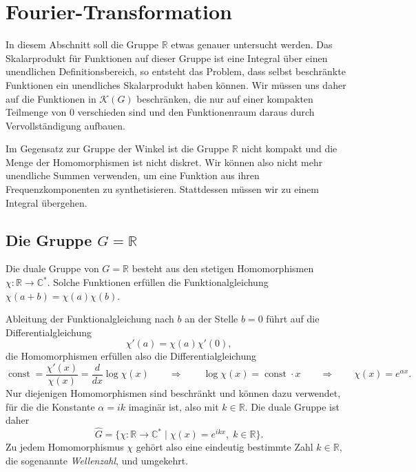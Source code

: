 %
%
%
\section{Fourier-Transformation
\label{buch:gruppen:section:fourier}}
In diesem Abschnitt soll die Gruppe $\mathbb{R}$ etwas genauer untersucht
werden.
Das Skalarprodukt für Funktionen auf dieser Gruppe ist eine Integral über
einen unendlichen Definitionsbereich, so entsteht das Problem, dass
selbst beschränkte Funktionen ein unendliches Skalarprodukt haben können.
Wir müssen uns daher auf die Funktionen in $\mathscr{K}(G)$ beschränken,
die nur auf einer kompakten Teilmenge von $0$ verschieden sind und den
Funktionenraum daraus durch Vervollständigung aufbauen.

Im Gegensatz zur Gruppe der Winkel ist die Gruppe $\mathbb{R}$ nicht kompakt
und die Menge der Homomorphismen ist nicht diskret.
Wir können also nicht mehr unendliche Summen verwenden, um eine Funktion
aus ihren Frequenzkomponenten zu synthetisieren.
Stattdessen müssen wir zu einem Integral übergehen.

%
%
\subsection{Die Gruppe $G=\mathbb{R}$
\label{buch:gruppen:fourier:subsection:gruppeR}}
Die duale Gruppe von $G=\mathbb{R}$ besteht aus den stetigen Homomorphismen
$\chi:\mathbb{R}\to\mathbb{C}^*$.
Solche Funktionen erfüllen die Funktionalgleichung $\chi(a+b)=\chi(a)\chi(b)$.

Ableitung der Funktionalgleichung nach $b$ an der Stelle $b=0$ führt auf
die Differentialgleichung
\[
\chi'(a) = \chi(a)\chi'(0),
\]
die Homomorphismen erfüllen also die Differentialgleichung
\[
\operatorname{const}
=
\frac{\chi'(x)}{\chi(x)} 
=
\frac{d}{dx}\log\chi(x)
\qquad\Rightarrow\qquad
\log\chi(x) = \operatorname{const}\cdot x
\qquad\Rightarrow\qquad
\chi(x) = e^{\alpha x}.
\]
Nur diejenigen Homomorphismen sind beschränkt und können dazu verwendet,
für die die Konstante $\alpha=ik$ imaginär ist, also mit $k\in\mathbb{R}$.
Die duale Gruppe ist daher
\[
\hat{G}
=
\{
\chi\colon\mathbb{R}\to\mathbb{C}^*
\mid
\chi(x) = e^{ikx},\; k\in \mathbb{R}
\}.
\]
Zu jedem Homomorphismus $\chi$ gehört also eine eindeutig bestimmte
Zahl $k\in\mathbb{R}$, die sogenannte {\em Wellenzahl},
%
und umgekehrt.

